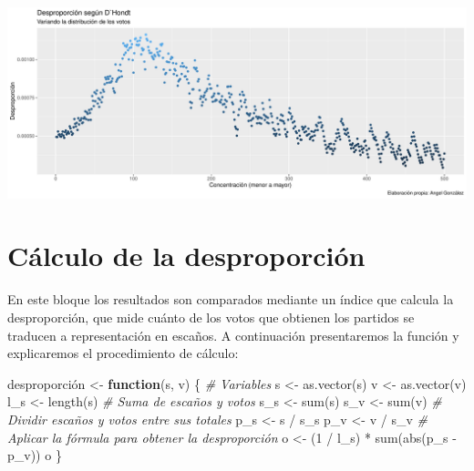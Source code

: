 \documentclass[12pt,a4paper,]{book}
\newenvironment{Shaded}{\begin{snugshade}}{\end{snugshade}}
\newcommand{\CommentTok}[1]{\textcolor[rgb]{0.56,0.35,0.01}{\textit{#1}}}
\newcommand{\ControlFlowTok}[1]{\textcolor[rgb]{0.13,0.29,0.53}{\textbf{#1}}}
\newcommand{\DecValTok}[1]{\textcolor[rgb]{0.00,0.00,0.81}{#1}}
\newcommand{\FunctionTok}[1]{\textcolor[rgb]{0.00,0.00,0.00}{#1}}
\newcommand{\NormalTok}[1]{#1}
\newcommand{\OtherTok}[1]{\textcolor[rgb]{0.56,0.35,0.01}{#1}}
\newcommand{\SpecialCharTok}[1]{\textcolor[rgb]{0.00,0.00,0.00}{#1}}
\numberwithin{dummy}{section}
\theoremstyle{ocrenumbox}
\theoremstyle{blacknumex}
\theoremstyle{blacknumbox}
\theoremstyle{ocrenum}
\theoremstyle{ocrenum}
\begin{document}
\begin{center}\includegraphics[width=0.95\linewidth]{figurasR/unnamed-chunk-14-1} \end{center}

\hypertarget{cuxe1lculo-de-la-desproporciuxf3n}{%
\section{Cálculo de la
desproporción}\label{cuxe1lculo-de-la-desproporciuxf3n}}

En este bloque los resultados son comparados mediante un índice que
calcula la desproporción, que mide cuánto de los votos que obtienen los
partidos se traducen a representación en escaños. A continuación
presentaremos la función y explicaremos el procedimiento de cálculo:

\begin{Shaded}
\begin{Highlighting}[]
\NormalTok{desproporción }\OtherTok{\textless{}{-}}
  \ControlFlowTok{function}\NormalTok{(s, v) \{  }\CommentTok{\# Variables}
\NormalTok{    s }\OtherTok{\textless{}{-}} \FunctionTok{as.vector}\NormalTok{(s)}
\NormalTok{    v }\OtherTok{\textless{}{-}} \FunctionTok{as.vector}\NormalTok{(v)}
\NormalTok{    l\_s }\OtherTok{\textless{}{-}} \FunctionTok{length}\NormalTok{(s)}
    \CommentTok{\# Suma de escaños y votos}
\NormalTok{    s\_s }\OtherTok{\textless{}{-}} \FunctionTok{sum}\NormalTok{(s)   }
\NormalTok{    s\_v }\OtherTok{\textless{}{-}} \FunctionTok{sum}\NormalTok{(v)}
    \CommentTok{\# Dividir escaños y votos entre sus totales}
\NormalTok{    p\_s }\OtherTok{\textless{}{-}}\NormalTok{ s }\SpecialCharTok{/}\NormalTok{ s\_s}
\NormalTok{    p\_v }\OtherTok{\textless{}{-}}\NormalTok{ v }\SpecialCharTok{/}\NormalTok{ s\_v}
    \CommentTok{\# Aplicar la fórmula para obtener la desproporción}
\NormalTok{    o }\OtherTok{\textless{}{-}}\NormalTok{ (}\DecValTok{1} \SpecialCharTok{/}\NormalTok{ l\_s) }\SpecialCharTok{*} \FunctionTok{sum}\NormalTok{(}\FunctionTok{abs}\NormalTok{(p\_s }\SpecialCharTok{{-}}\NormalTok{ p\_v))}
\NormalTok{    o}
\NormalTok{  \}}
\end{Highlighting}
\end{Shaded}
\end{document}
